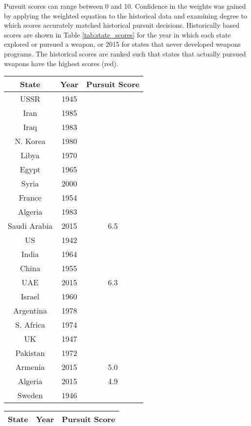 Pursuit scores can range between 0 and 10.  Confidence in the weights was gained by applying the weighted equation to the historical data and examining degree to which scores accurately matched historical pursuit decisions.  Historically based scores are shown in Table \ref{tab:state_scores} for the year in which each state explored or pursued a weapon, or 2015 for states that never developed weapons programs. The historical scores are ranked such that states that actually pursued weapons have the highest scores (red).

\begin{table}
  \centering
  \begin{minipage}{.5\textwidth}

\begin{tabular}{|c|c|c|}
\hline
\textbf{State} & \textbf{Year}  & \textbf{Pursuit Score} \\
\hline
USSR & 1945 & \color{red}{8.9} \\
Iran & 1985 & \color{red}{8.3} \\
Iraq & 1983 & \color{red}{8.2} \\
N. Korea & 1980 & \color{red}{7.7} \\
Libya & 1970 & \color{red}{7.4} \\
Egypt & 1965 & \color{red}{7.3} \\
Syria & 2000 & \color{red}{6.9} \\
France & 1954 & \color{red}{6.8} \\
Algeria & 1983 & \color{red}{6.6} \\
Saudi Arabia & 2015 & 6.5 \\
US & 1942 & \color{red}{6.5} \\
India & 1964 & \color{red}{6.4} \\
China & 1955 & \color{red}{6.3} \\
UAE & 2015 & 6.3 \\
Israel & 1960 & \color{red}{6.2} \\
Argentina & 1978 & \color{red}{6.1} \\
S. Africa & 1974 & \color{red}{5.9} \\
UK & 1947 & \color{red}{5.8} \\
Pakistan & 1972 & \color{red}{5.3} \\
Armenia & 2015 & 5.0 \\
Algeria & 2015 & 4.9 \\
Sweden & 1946 & \color{red}{4.8} \\

\hline
\end{tabular}
\end{minipage}\hfill
\begin{minipage}{.5\textwidth}
\begin{tabular}{|c|c|c|}
\hline
\textbf{State} & \textbf{Year}  & \textbf{Pursuit Score} \\
\hline


\end{tabular}
\end{minipage}
\end{table}
